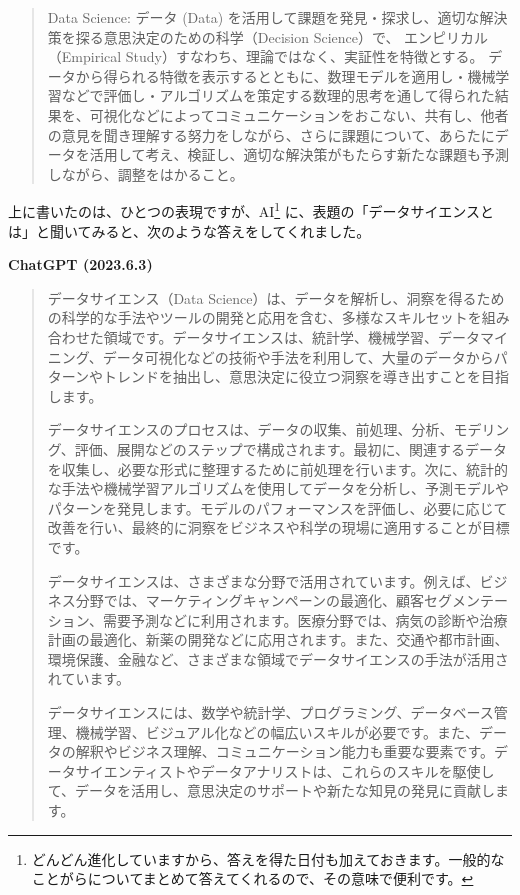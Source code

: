 \documentclass[
  xelatex, ja=standard]{bxjsbook}
\theoremstyle{definition}
\theoremstyle{definition}
\theoremstyle{definition}
\theoremstyle{definition}
\theoremstyle{remark}
\begin{document}
\begin{quote}
Data Science: データ (Data) を活用して課題を発見・探求し、適切な解決策を探る意思決定のための科学（Decision Science）で、 エンピリカル（Empirical Study）すなわち、理論ではなく、実証性を特徴とする。 データから得られる特徴を表示するとともに、数理モデルを適用し・機械学習などで評価し・アルゴリズムを策定する数理的思考を通して得られた結果を、可視化などによってコミュニケーションをおこない、共有し、他者の意見を聞き理解する努力をしながら、さらに課題について、あらたにデータを活用して考え、検証し、適切な解決策がもたらす新たな課題も予測しながら、調整をはかること。
\end{quote}

上に書いたのは、ひとつの表現ですが、AI\footnote{どんどん進化していますから、答えを得た日付も加えておきます。一般的なことがらについてまとめて答えてくれるので、その意味で便利です。} に、表題の「データサイエンスとは」と聞いてみると、次のような答えをしてくれました。

\textbf{ChatGPT (2023.6.3)}

\begin{quote}
データサイエンス（Data Science）は、データを解析し、洞察を得るための科学的な手法やツールの開発と応用を含む、多様なスキルセットを組み合わせた領域です。データサイエンスは、統計学、機械学習、データマイニング、データ可視化などの技術や手法を利用して、大量のデータからパターンやトレンドを抽出し、意思決定に役立つ洞察を導き出すことを目指します。

データサイエンスのプロセスは、データの収集、前処理、分析、モデリング、評価、展開などのステップで構成されます。最初に、関連するデータを収集し、必要な形式に整理するために前処理を行います。次に、統計的な手法や機械学習アルゴリズムを使用してデータを分析し、予測モデルやパターンを発見します。モデルのパフォーマンスを評価し、必要に応じて改善を行い、最終的に洞察をビジネスや科学の現場に適用することが目標です。

データサイエンスは、さまざまな分野で活用されています。例えば、ビジネス分野では、マーケティングキャンペーンの最適化、顧客セグメンテーション、需要予測などに利用されます。医療分野では、病気の診断や治療計画の最適化、新薬の開発などに応用されます。また、交通や都市計画、環境保護、金融など、さまざまな領域でデータサイエンスの手法が活用されています。

データサイエンスには、数学や統計学、プログラミング、データベース管理、機械学習、ビジュアル化などの幅広いスキルが必要です。また、データの解釈やビジネス理解、コミュニケーション能力も重要な要素です。データサイエンティストやデータアナリストは、これらのスキルを駆使して、データを活用し、意思決定のサポートや新たな知見の発見に貢献します。
\end{quote}
\end{document}
